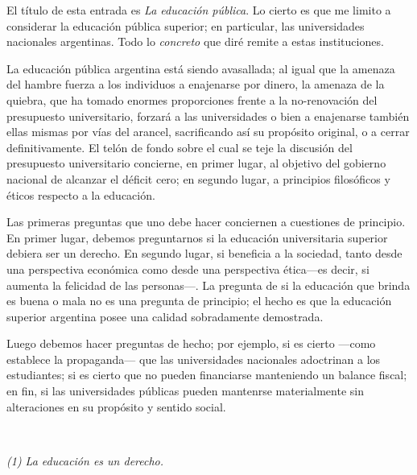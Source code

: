 \documentclass[a4paper, 12pt]{article}
\begin{document}
El título de esta entrada es \textit{La educación pública}. Lo cierto es que me
limito a considerar la educación pública superior; en particular, las
universidades nacionales argentinas. Todo lo \textit{concreto} que diré remite a
estas instituciones. 

La educación pública argentina está siendo avasallada; al igual que la amenaza
del hambre fuerza a los individuos a enajenarse por dinero, la amenaza de la
quiebra, que ha tomado enormes proporciones frente a la no-renovación del
presupuesto universitario, forzará a las universidades o bien a enajenarse
también ellas mismas por vías del arancel, sacrificando así su propósito
original, o a cerrar definitivamente. El telón de fondo sobre el cual se teje
la discusión del presupuesto universitario concierne, en primer lugar, al
objetivo del gobierno nacional de alcanzar el déficit cero; en segundo lugar, a
principios filosóficos y éticos respecto a la educación.

Las primeras preguntas que uno debe hacer conciernen a cuestiones de principio.
En primer lugar, debemos preguntarnos si la educación universitaria superior
debiera ser un derecho. En segundo lugar, si beneficia a la sociedad, tanto
desde una perspectiva económica como desde una perspectiva ética---es decir, si
aumenta la felicidad de las personas---. La pregunta de si la educación que
brinda es buena o mala no es una pregunta de principio; el hecho es que la
educación superior argentina posee una calidad sobradamente demostrada.

Luego debemos hacer preguntas de hecho; por ejemplo, si es cierto ---como
establece la propaganda--- que las universidades nacionales adoctrinan a los
estudiantes; si es cierto que no pueden financiarse manteniendo un balance
fiscal; en fin, si las universidades públicas pueden mantenrse materialmente sin
alteraciones en su propósito y sentido social.

~

\textit{(1) La educación es un derecho.} 
\end{document}
